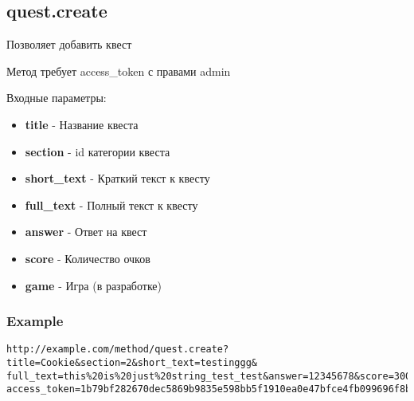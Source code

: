 \subsection{quest.create}
Позволяет добавить квест

Метод требует access\_token с правами admin

Входные параметры:
\begin{itemize}
  \item \textbf{title} - Название квеста
  \item \textbf{section} - id категории квеста
  \item \textbf{short\_text} - Краткий текст к квесту
  \item \textbf{full\_text} - Полный текст к квесту
  \item \textbf{answer} - Ответ на квест
  \item \textbf{score} - Количество очков
  \item \textbf{game} - Игра (в разработке)
\end{itemize}

\subsubsection{Example}
\begin{Verbatim}[frame=single]
http://example.com/method/quest.create?title=Cookie&section=2&short_text=testinggg&
full_text=this%20is%20just%20string_test_test&answer=12345678&score=300&
access_token=1b79bf282670dec5869b9835e598bb5f1910ea0e47bfce4fb099696f8b2cef9d
\end{Verbatim}